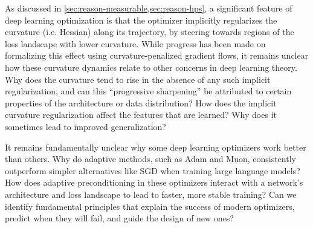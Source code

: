\begin{opendirection}
\label{openquestion:loss-curvature}
As discussed in \cref{sec:reason-measurable,sec:reason-hps}, a significant feature of deep learning optimization is that the optimizer implicitly regularizes the curvature (i.e. Hessian) along its trajectory, by steering towards regions of the loss landscape with lower curvature.  While progress has been made on formalizing this effect using curvature-penalized gradient flows, it remains unclear how these curvature dynamics relate to other concerns in deep learning theory.  Why does the curvature tend to rise in the absence of any such implicit regularization, and can this ``progressive sharpening'' be attributed to certain properties of the architecture or data distribution?  How does the implicit curvature regularization affect the features that are learned?  Why does it sometimes lead to improved generalization?
\end{opendirection}

\begin{opendirection}
\label{openquestion:good-optimizer}

It remains fundamentally unclear why some deep learning optimizers work better than others.
Why do adaptive methods, such as Adam and Muon, consistently outperform simpler alternatives like SGD when training large language models?
How does adaptive preconditioning in these optimizers interact with a network's architecture and loss landscape to lead to faster, more stable training?
Can we identify fundamental principles that explain the success of modern optimizers, predict when they will fail, and guide the design of new ones?

\end{opendirection}

